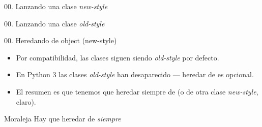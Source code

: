 \begin{frame}{00. Lanzando una clase \textit{new-style}}
  \vspace{0.5cm}
  \footnotesize
\end{frame}

\begin{frame}{00. Lanzando una clase \textit{old-style}}
  \vspace{0.5cm}
  \footnotesize
\end{frame}

\begin{frame}{00. Heredando de object (new-style)}
  \begin{itemize}
    \item Por compatibilidad, las clases siguen siendo
      \textit{old-style} por defecto.
    \item En Python 3 las clases \textit{old-style} han desaparecido —
      heredar de  es opcional.
    \item El resumen es que tenemos que heredar siempre de
       (o de otra clase \textit{new-style}, claro).
  \end{itemize}

  \begin{alertblock}{\centering Moraleja}
    \centering Hay que heredar de  \emph{siempre}
  \end{alertblock}
\end{frame}
